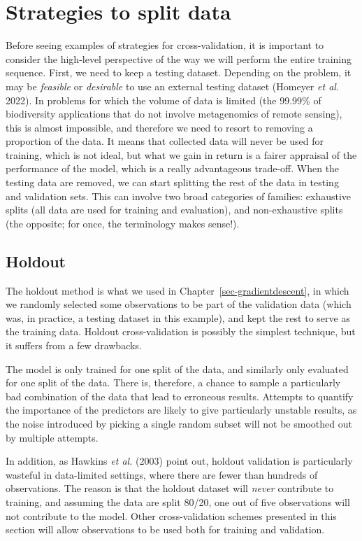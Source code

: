 \documentclass[
  letterpaper,
]{scrbook}
\begin{document}
\section{Strategies to split data}\label{strategies-to-split-data}

Before seeing examples of strategies for cross-validation, it is
important to consider the high-level perspective of the way we will
perform the entire training sequence. First, we need to keep a testing
dataset. Depending on the problem, it may be \emph{feasible} or
\emph{desirable} to use an external testing dataset (Homeyer \emph{et
al.} 2022). In problems for which the volume of data is limited (the
99.99\% of biodiversity applications that do not involve metagenomics of
remote sensing), this is almost impossible, and therefore we need to
resort to removing a proportion of the data. It means that collected
data will never be used for training, which is not ideal, but what we
gain in return is a fairer appraisal of the performance of the model,
which is a really advantageous trade-off. When the testing data are
removed, we can start splitting the rest of the data in testing and
validation sets. This can involve two broad categories of families:
exhaustive splits (all data are used for training and evaluation), and
non-exhaustive splits (the opposite; for once, the terminology makes
sense!).

\subsection{Holdout}\label{holdout}

The holdout method is what we used in Chapter~\ref{sec-gradientdescent},
in which we randomly selected some observations to be part of the
validation data (which was, in practice, a testing dataset in this
example), and kept the rest to serve as the training data. Holdout
cross-validation is possibly the simplest technique, but it suffers from
a few drawbacks.

The model is only trained for one split of the data, and similarly only
evaluated for one split of the data. There is, therefore, a chance to
sample a particularly bad combination of the data that lead to erroneous
results. Attempts to quantify the importance of the predictors are
likely to give particularly unstable results, as the noise introduced by
picking a single random subset will not be smoothed out by multiple
attempts.

In addition, as Hawkins \emph{et al.} (2003) point out, holdout
validation is particularly wasteful in data-limited settings, where
there are fewer than hundreds of observations. The reason is that the
holdout dataset will \emph{never} contribute to training, and assuming
the data are split 80/20, one out of five observations will not
contribute to the model. Other cross-validation schemes presented in
this section will allow observations to be used both for training and
validation.
\end{document}
